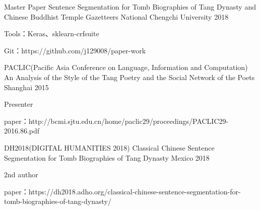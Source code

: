 

\begin{cventries}
  \cventry
    {Master Paper} %
    {Sentence Segmentation for Tomb Biographies of Tang Dynasty and Chinese Buddhist Temple Gazetteers} %
    {National Chengchi University} %
    {2018} %
    {
      \begin{cvitems} %
        \item {Tools：Keras、sklearn-crfsuite}
        \item {Git：https://github.com/j129008/paper-work}
      \end{cvitems}
    }


  \cventry
    {PACLIC(Pacific Asia Conference on Language, Information and Computation)} %
    {An Analysis of the Style of the Tang Poetry and the Social Network of the Poets}
    {Shanghai} %
    {2015} %
    {
      \begin{cvitems} %
        \item {Presenter} %
        \item {paper：http://bcmi.sjtu.edu.cn/home/paclic29/proceedings/PACLIC29-2016.86.pdf}
      \end{cvitems}
    }


  \cventry
    {DH2018(DIGITAL HUMANITIES 2018)} %
    {Classical Chinese Sentence Segmentation for Tomb Biographies of Tang Dynasty} %
    {Mexico} %
    {2018} %
    {
      \begin{cvitems} %
      \item {2nd author} %
        \item {paper：https://dh2018.adho.org/classical-chinese-sentence-segmentation-for-tomb-biographies-of-tang-dynasty/}
      \end{cvitems}
    }

\end{cventries}
